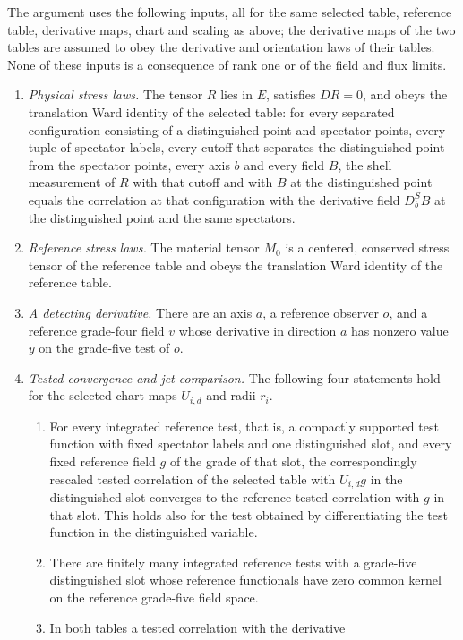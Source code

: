 The argument uses the following inputs, all for the same selected table,
reference table, derivative maps, chart and scaling as above; the
derivative maps of the two tables are assumed to obey the derivative and
orientation laws of their tables. None of these inputs
is a consequence of rank one or of the field and flux limits.
\begin{enumerate}
\item \emph{Physical stress laws.} The tensor $R$ lies in $E$, satisfies
 $DR=0$, and obeys the translation Ward identity of the selected table:
 for every separated configuration consisting of a distinguished point and
 spectator points, every tuple of spectator labels, every cutoff that
 separates the distinguished point from the spectator points, every axis
 $b$ and every field $B$, the shell measurement of $R$ with that cutoff
 and with $B$ at the distinguished point equals the correlation at that
 configuration with the derivative field $D_b^SB$ at the distinguished
 point and the same spectators.
\item \emph{Reference stress laws.} The material tensor $M_0$ is a
 centered, conserved stress tensor of the reference table and obeys the
 translation Ward identity of the reference table.
\item \emph{A detecting derivative.} There are an axis $a$, a reference
 observer $o$, and a reference grade-four field $v$ whose derivative in
 direction $a$ has nonzero value $y$ on the grade-five test of $o$.
\item \emph{Tested convergence and jet comparison.} The following four
 statements hold for the selected chart maps $U_{i,d}$ and radii $r_i$.
 \begin{enumerate}
 \item[(4a)] For every integrated reference test, that is, a compactly
  supported test function with fixed spectator labels and one
  distinguished slot, and every fixed reference field $g$ of the grade
  of that slot, the correspondingly rescaled tested correlation of the
  selected table with $U_{i,d}g$ in the distinguished slot converges to
  the reference tested correlation with $g$ in that slot. This holds
  also for the test obtained by differentiating the test function in
  the distinguished variable.
 \item[(4b)] There are finitely many integrated reference tests with a
  grade-five distinguished slot whose reference functionals have zero
  common kernel on the reference grade-five field space.
 \item[(4c)] In both tables a tested correlation with the derivative

\end{enumerate}
\end{enumerate}
